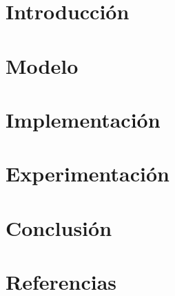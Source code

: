 \documentclass[a4paper]{article}
\begin{document}
\tableofcontents

\newpage
\section{Introducción}


\newpage
\section{Modelo}


\newpage
\section{Implementación}\label{Implementacion}


\newpage
\section{Experimentación}


\newpage
\section{Conclusión}
%

\newpage

\section{Referencias}
\begingroup
\renewcommand{\section}[2]{}

\endgroup

\newpage
\section{Enunciado}


\newpage
\appendix

\end{document}

